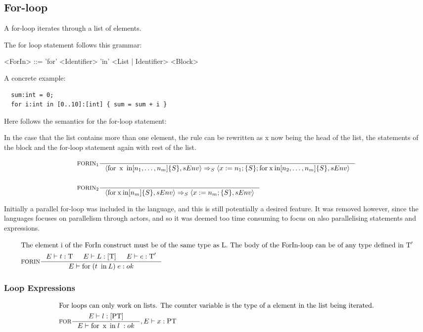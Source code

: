 \subsection{For-loop}
\label{subsec:forLoopStatements}

A for-loop iterates through a list of elements.

The for loop statement follows this grammar:

\begin{grammar}
<ForIn> ::= 'for' <Identifier> 'in' <List | Identifier> <Block>
\end{grammar}

A concrete example:

\begin{verbatim}
  sum:int = 0;
  for i:int in [0..10]:[int] { sum = sum + i }
\end{verbatim}

Here follows the semantics for the for-loop statement:

In the case that the list contains more than one element, the rule can be rewritten as x now being the head of the list, the statements of the block and the for-loop statement again with rest of the list.

\begin{align*}
&\inference[$\text{FORIN}_{1}$]{}
                       {\Braket{\Tfor \Tx \Tin [n_1,\dots,n_m]\{S\},sEnv} \Rightarrow_S \Braket{x := n_1;\{S\}; \Tfor \mathbin{\text{x}} \mathbin{\text{in}} [n_2,\dots,n_m]\{S\},sEnv}}
\\\\
&\inference[$\text{FORIN}_{2}$]{}
                       {\Braket{\Tfor \mathbin{\text{x}}\mathbin{\text{in}} [n_m]\{S\},sEnv} \Rightarrow_S \Braket{x := n_m;\{S\},sEnv}}
\end{align*}

Initially a parallel for-loop was included in the language, and this is still potentially a desired feature. It was removed however, since the languages focuses on parallelism through actors, and so it was deemed too time consuming to focus on also parallelising statements and expressions.

\begin{align*}
\intertext{The element i of the ForIn construct must be of the same type as L. The body of the ForIn-loop can be of any type defined in $\Tt'$}
&\inference[FORIN]{\Tenv t : \Tt &
                   \Tenv L : [\Tt] &
                  \Tenv e : \Tt'}
                 {\Tenv \mathbin{\text{for}} \; (t \; \mathbin{\text{in}} L) \; {e}: ok}
\end{align*}

\subsubsection{Loop Expressions}
\begin{align*}
\intertext{For loops can only work on lists. The counter variable is the type of a element in the list being iterated.}
&\inference[FOR]{\Tenv l : [\Tpt]}
                 {\Tenv \mathbin{\text{for}} \; \mathbin{\text{x}} \; \mathbin{\text{in}} \; {l} \; : ok },	 \Tenv x : \Tpt
\end{align*}
